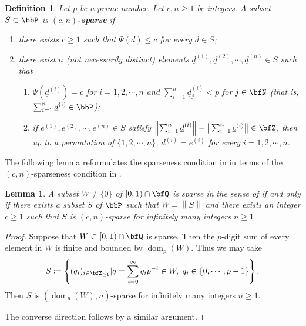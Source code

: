 \documentclass[english,oneside]{smfart}
\newcommand{\opn}[1]{\operatorname{#1}}
\newcommand{\uld}{\underline{d}}
\newcommand{\norm}[1]{\left\lVert#1\right\rVert}
\newtheorem{lemma}[theorem]{Lemma}
\newtheorem{definition}[theorem]{Definition}
\begin{document}
\begin{definition}\label{def:38144}
    Let $p$ be a prime number. Let $c, n \geq 1$ be integers. A subset $S\subset\bbP$ is \textbf{$(c,n)$-sparse} if
    \begin{enumerate}
        \item there exists $c\geq 1$ such that $\Psi(\uld)\leq c$ for every $\uld\in S$;
        \item there exist $n$ (not necessarily distinct) elements $\uld^{(1)}, \uld^{(2)}, \cdots, \uld^{(n)}\in S$ such that
              \begin{enumerate}
                  \item $\Psi\left(\uld^{(i)}\right)=c$ for $i=1,2,\cdots,n$ and $\sum_{i=1}^n \uld^{(i)}_j< p$ for $j\in\bfN$ (that is, $\sum_{i=1}^n \uld^{(i)}\in\bbP$);
                  \item if $\underline{e}^{(1)}, \underline{e}^{(2)}, \cdots, \underline{e}^{(n)}\in S$ satisfy $\left\lVert\sum_{i=1}^n \uld^{(i)}\right\rVert-\left\lVert\sum_{i=1}^n \underline{e}^{(i)}\right\rVert\in\bfZ$, then up to a permutation of $\{1,2,\cdots,n\}$, $\uld^{(i)}=\underline{e}^{(i)}$ for every $i=1,2,\cdots,n$.
              \end{enumerate}
    \end{enumerate}
\end{definition}
The following lemma reformulates the sparseness condition in  in terms of the $(c,n)$-sparseness condition in .
\begin{lemma}\label{lem:54409}
    A subset $W\neq\{0\}$ of $[0,1)\cap\bfQ$ is sparse in the sense of  if and only if there exists a subset $S$ of $\bbP$ such that $W=\norm{S}$ and there exists an integer $c\geq 1$ such that $S$ is $(c,n)$-sparse for infinitely many integers $n\geq 1$.
\end{lemma}
\begin{proof}
    Suppose that $W\subset [0,1)\cap\bfQ$ is sparse. Then the $p$-digit sum of every element in $W$ is finite and bounded by $\opn{dom}_p(W)$. Thus we may take
    $$S\coloneqq \left\{(q_i)_{i\in\bfZ_{\geq 1}}|q=\sum_{i=0}^\infty q_i p^{-i}\in W,\ q_i\in\{0,\cdots,p-1\}\right\}.$$
    Then $S$ is $(\opn{dom}_p(W),n)$-sparse for infinitely many integers $n\geq 1$.

    The converse direction follows by a similar argument.
\end{proof}
\end{document}
